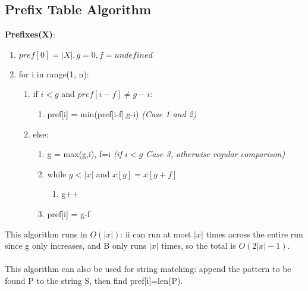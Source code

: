 \subsection{Prefix Table Algorithm}
\textbf{Prefixes(X)}:
\begin{enumerate}[label=\Alph*]
    \item \(pref[0]= |X|, g=0, f = undefined\)
    \item for i in range(1, n):
\begin{enumerate}[label=\arabic*]
    \item if $ i < g$ and $pref[i-f] \neq g-i $:
    \begin{enumerate}
        \item [] pref[i] = min(pref[i-f],g-i) \emph{(Case 1 and 2)}
    \end{enumerate}    
    \item else:
    \begin{enumerate}
        \item g = max(g,i),   f=i \emph{(if $i < g$ Case 3, otherwise regular comparison)}
        \item while \( g < |x| \) and \( x[g] = x[g+f]\)
        \begin{enumerate}
            \item [] g++ 
        \end{enumerate}   
        \item pref[i] = g-f
    \end{enumerate}  
\end{enumerate}    
\end{enumerate}
This algorithm runs in $O(|x|)$: ii can run at most $|x|$ times across the entire run since g only increases, and B only runs $|x|$ times, so the total is $O(2|x|-1)$. \\ \\
This algorithm can also be used for string matching: append the pattern to be found P to the string S, then find pref[i]=len(P).
